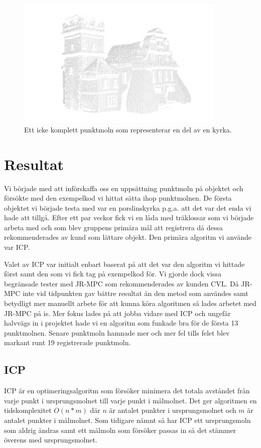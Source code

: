\begin{figure}[H]
	\centering
	\includegraphics[width=100mm]{figures/icke_komplett_moln_kyrka.png}
	\caption{Ett icke komplett punktmoln som representerar en del av en kyrka.}
	\label{fig:karlsson-single_scan-church}
\end{figure}


\section{Resultat}
\label{sec:results-karlsson}


Vi började med att införskaffa oss en uppsättning punktmoln på objektet och försökte med den exempelkod vi hittat sätta ihop punktmolnen. De första objektet vi började testa med var en porslinskyrka p.g.a. att det var det enda vi hade att tillgå. Efter ett par veckor fick vi en låda med träklossar som vi började arbeta med och som blev gruppens primära mål att registrera då dessa rekommenderades av kund som lättare objekt. Den primära algoritm vi använde var ICP. 

Valet av ICP var initialt enbart baserat på att det var den algoritm vi hittade först samt den som vi fick tag på exempelkod för. Vi gjorde dock vissa begränsade tester med JR-MPC som rekommenderades av kunden CVL. Då JR-MPC inte vid tidpunkten gav bättre resultat än den metod som användes samt betydligt mer manuellt arbete för att kunna köra algoritmen så lades arbetet med JR-MPC på is. Mer fokus lades på att jobba vidare med ICP och ungefär halvvägs in i projektet hade vi en algoritm som funkade bra för de första 13 punktmolnen. Senare punktmoln hamnade mer och mer fel tills felet blev markant runt 19 registrerade punktmoln. 


\subsection{ICP}
ICP är en optimeringsalgoritm som försöker minimera det totala avståndet från varje punkt i ursprungsmolnet till varje punkt i målmolnet. Det ger algoritmen en tidskomplexitet $ \mathit{O(n*m)} $ där $ \mathit{n} $ är antalet punkter i ursprungsmolnet och $ \mathit{m} $ är antalet punkter i målmolnet. Som tidigare nämnt så har ICP ett ursprungsmoln som aldrig ändras samt ett målmoln som försöker passas in så det stämmer överens med ursprungsmolnet. 

